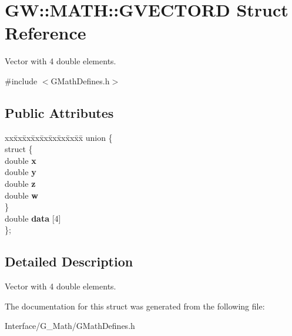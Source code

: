 \hypertarget{structGW_1_1MATH_1_1GVECTORD}{}\section{GW\+::M\+A\+TH\+::G\+V\+E\+C\+T\+O\+RD Struct Reference}
\label{structGW_1_1MATH_1_1GVECTORD}


Vector with 4 double elements.  




{\ttfamily \#include $<$G\+Math\+Defines.\+h$>$}

\subsection*{Public Attributes}
\begin{DoxyCompactItemize}
\item 
\mbox{\label{structGW_1_1MATH_1_1GVECTORD_a16fd4343a1d6a83698bc6bfaa968fd5f}} 
\begin{tabbing}
xx\=xx\=xx\=xx\=xx\=xx\=xx\=xx\=xx\=\kill
union \{\\
\mbox{\label{unionGW_1_1MATH_1_1GVECTORD_1_1_0D8_a17a8f0ae8f4361d5e49a0b49c723ba55}} 
\>struct \{\\
\>\>double {\bfseries x}\\
\>\>double {\bfseries y}\\
\>\>double {\bfseries z}\\
\>\>double {\bfseries w}\\
\>\} \\
\>double {\bfseries data} \mbox{[}4\mbox{]}\\
\}; \\

\end{tabbing}\end{DoxyCompactItemize}


\subsection{Detailed Description}
Vector with 4 double elements. 

The documentation for this struct was generated from the following file\+:\begin{DoxyCompactItemize}
\item 
Interface/\+G\+\_\+\+Math/G\+Math\+Defines.\+h\end{DoxyCompactItemize}
